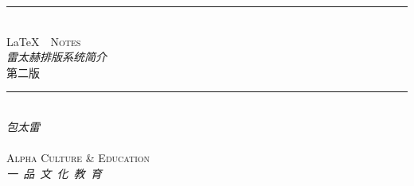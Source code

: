 \begin{titlepage}
\begin{center}
\hrule\ \\[5pt]
\Huge \LaTeX\ \ \textsc{Notes}\\[8pt]
\Large \textit{雷太赫排版系统简介}\\[8pt]
\normalsize 第二版\ \ \lnotesversion\\[20pt]
\hrule\ \\[100pt]

\huge \textit{包太雷}\\[8pt]
\Large \lnotesdate\\[200pt]

\textsc{Alpha Culture \& Education}\\[8pt]
\huge \textit{一\ 品\ 文\ 化\ 教\ 育}
\normalsize
\end{center}
\end{titlepage}
